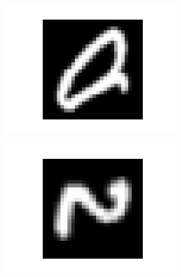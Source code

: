 \documentclass[14pt,a4paper]{extarticle}
\begin{document}
\begin{figure}[htb]
\begin{subfigure}[b]{0.3\textwidth}
    \includegraphics[width=\textwidth]{../res/emnist/sample_6.png}
    \label{fig:emnist_sample_6}
  \end{subfigure}
  \hfill
  \begin{subfigure}[b]{0.3\textwidth}
    \includegraphics[width=\textwidth]{../res/emnist/sample_7.png}
    \label{fig:emnist_sample_7}
  \end{subfigure}
  \hfill
  \begin{subfigure}[b]{0.3\textwidth}

\end{subfigure}
\end{figure}
\end{document}
